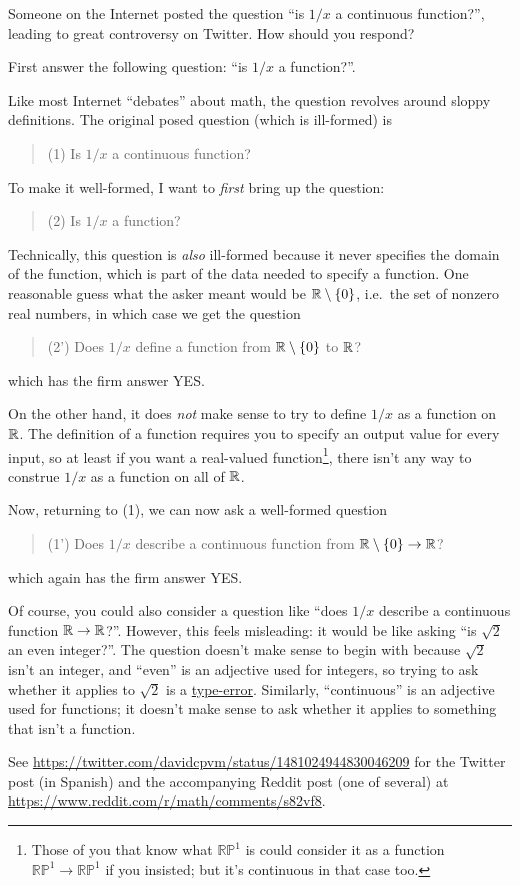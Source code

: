 \begin{problem}
	Someone on the Internet posted the question ``is $1/x$ a continuous function?'',
	leading to great controversy on Twitter. How should you respond?
	\begin{hint}
		First answer the following question: ``is $1/x$ a function?''.
	\end{hint}
	\begin{sol}
		Like most Internet ``debates'' about math,
		the question revolves around sloppy definitions.
		The original posed question (which is ill-formed) is
		\begin{quote}
			(1) Is $1/x$ a continuous function?
		\end{quote}
		To make it well-formed, I want to \emph{first} bring up the question:
		\begin{quote}
			(2) Is $1/x$ a function?
		\end{quote}
		Technically, this question is \emph{also} ill-formed because it never specifies
		the domain of the function, which is part of the data needed to specify a function.
		One reasonable guess what the asker meant would be $\mathbb R \setminus \{0\}$,
		i.e.\ the set of nonzero real numbers, in which case we get the question
		\begin{quote}
			(2') Does $1/x$ define a function from $\mathbb R \setminus \{0\}$ to $\mathbb R$?
		\end{quote}
		which has the firm answer YES.

		On the other hand, it does \emph{not} make sense to try to define $1/x$
		as a function on $\mathbb R$.
		The definition of a function requires you to specify an output value for every input,
		so at least if you want a real-valued function\footnote{Those of you
			that know what $\mathbb{RP}^1$ is could consider it as a function
			$\mathbb{RP}^1 \to \mathbb{RP}^1$ if you insisted;
			but it's continuous in that case too.},
		there isn't any way to construe $1/x$ as a function on all of $\mathbb R$.

		Now, returning to (1), we can now ask a well-formed question
		\begin{quote}
			(1') Does $1/x$ describe a continuous function from $\mathbb R \setminus \{0\} \to \mathbb R$?
		\end{quote}
		which again has the firm answer YES.

		Of course, you could also consider a question like
		``does $1/x$ describe a continuous function $\mathbb R \to \mathbb R$?''.
		However, this feels misleading:
		it would be like asking ``is $\sqrt{2}$ an even integer?''.
		The question doesn't make sense to begin with because $\sqrt2$ isn't an integer,
		and ``even'' is an adjective used for integers,
		so trying to ask whether it applies to $\sqrt2$ is a \href{https://qchu.wordpress.com/2013/05/28/the-type-system-of-mathematics/}{type-error}.
		Similarly, ``continuous'' is an adjective used for functions;
		it doesn't make sense to ask whether it applies to something that isn't a function.

		See \url{https://twitter.com/davidcpvm/status/1481024944830046209}
		for the Twitter post (in Spanish) and the accompanying Reddit post (one of several)
		at \url{https://www.reddit.com/r/math/comments/s82vf8}.
	\end{sol}
\end{problem}

